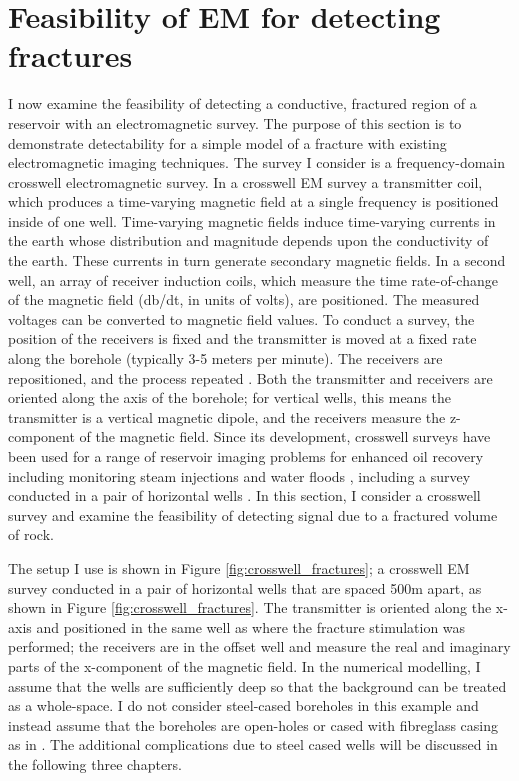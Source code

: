 \section{Feasibility of EM for detecting fractures}
I now examine the feasibility of detecting a conductive, fractured region of a reservoir with an electromagnetic survey. The purpose of this section is to demonstrate detectability for a simple model of a fracture with existing electromagnetic imaging techniques. The survey I consider is a frequency-domain crosswell electromagnetic survey. In a crosswell EM survey a transmitter coil, which produces a time-varying magnetic field at a single frequency is positioned inside of one well. Time-varying magnetic fields induce time-varying currents in the earth whose distribution and magnitude depends upon the conductivity of the earth. These currents in turn generate secondary magnetic fields. In a second well, an array of receiver induction coils, which measure the time rate-of-change of the magnetic field (db/dt, in units of volts), are positioned. The measured voltages can be converted to magnetic field values. To conduct a survey, the position of the receivers is fixed and the transmitter is moved at a fixed rate along the borehole (typically 3-5 meters per minute). The receivers are repositioned, and the process repeated \citep{Wilt1995}. Both the transmitter and receivers are oriented along the axis of the borehole; for vertical wells, this means the transmitter is a vertical magnetic dipole, and the receivers measure the z-component of the magnetic field. Since its development, crosswell surveys have been used for a range of reservoir imaging problems for enhanced oil recovery including monitoring steam injections \citep{Wilt1997} and water floods \citep{Wilt2012}, including a survey conducted in a pair of horizontal wells \citep{Marsala2015, Marsala2015a}. In this section, I consider a crosswell survey and examine the feasibility of detecting signal due to a fractured volume of rock.

The setup I use is shown in Figure \ref{fig:crosswell_fractures}; a crosswell EM survey conducted in a pair of horizontal wells that are spaced 500m apart, as shown in Figure \ref{fig:crosswell_fractures}. The transmitter is oriented along the x-axis and positioned in the same well as where the fracture stimulation was performed; the receivers are in the offset well and measure the real and imaginary parts of the x-component of the magnetic field. In the numerical modelling, I assume that the wells are sufficiently deep so that the background can be treated as a whole-space. I do not consider steel-cased boreholes in this example and instead assume that the boreholes are open-holes or cased with fibreglass casing as in \cite{Wilt2012}. The additional complications due to steel cased wells will be discussed in the following three chapters.


